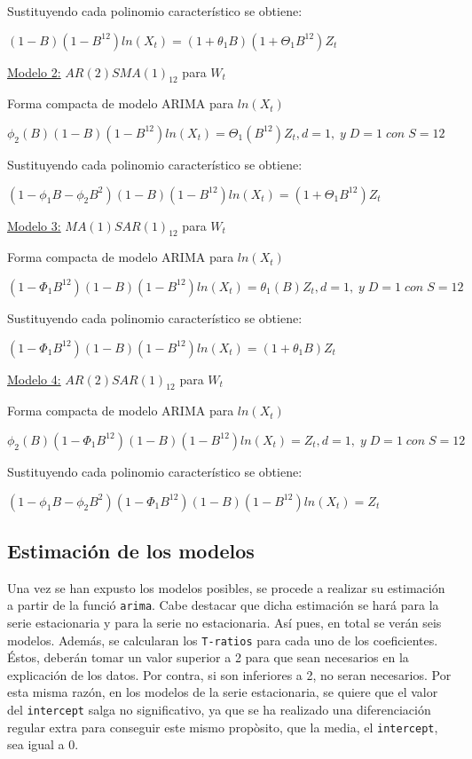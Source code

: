 \documentclass[
]{article}
\begin{document}
Sustituyendo cada polinomio característico se obtiene:

\((1-B)(1-B^{12}) ln(X_t) = (1+\theta_1B)(1+\Theta_1B^{12})Z_t\)

\medskip

\underline{Modelo 2:} \(AR(2)SMA(1)_{12}\) para \(W_t\)

Forma compacta de modelo ARIMA para \(ln(X_t)\)

\(\phi_2(B) (1-B)(1-B^{12}) ln(X_t) = \Theta_1(B^{12})Z_t, d = 1,\; y \; D = 1 \; con \; S = 12\)

Sustituyendo cada polinomio característico se obtiene:

\((1-\phi_1B-\phi_2B^2)(1-B)(1-B^{12}) ln(X_t) = (1+\Theta_1B^{12})Z_t\)

\medskip

\underline{Modelo 3:} \(MA(1)SAR(1)_{12}\) para \(W_t\)

Forma compacta de modelo ARIMA para \(ln(X_t)\)

\((1-\Phi_1B^{12})(1-B)(1-B^{12}) ln(X_t) =\theta_1(B)Z_t, d = 1,\; y \; D = 1 \; con \; S = 12\)

Sustituyendo cada polinomio característico se obtiene:

\((1-\Phi_1B^{12})(1-B)(1-B^{12}) ln(X_t) = (1+\theta_1B)Z_t\)

\medskip

\underline{Modelo 4:} \(AR(2)SAR(1)_{12}\) para \(W_t\)

Forma compacta de modelo ARIMA para \(ln(X_t)\)

\(\phi_2(B)(1-\Phi_1B^{12})(1-B)(1-B^{12}) ln(X_t) = Z_t, d = 1,\; y \; D = 1 \; con \; S = 12\)

Sustituyendo cada polinomio característico se obtiene:

\((1-\phi_1B-\phi_2B^2)(1-\Phi_1B^{12})(1-B)(1-B^{12}) ln(X_t) = Z_t\)

\hypertarget{estimaciuxf3n-de-los-modelos}{%
\subsection{Estimación de los
modelos}\label{estimaciuxf3n-de-los-modelos}}

Una vez se han expusto los modelos posibles, se procede a realizar su
estimación a partir de la funció \texttt{arima}. Cabe destacar que dicha
estimación se hará para la serie estacionaria y para la serie no
estacionaria. Así pues, en total se verán seis modelos. Además, se
calcularan los \texttt{T-ratios} para cada uno de los coeficientes.
Éstos, deberán tomar un valor superior a 2 para que sean necesarios en
la explicación de los datos. Por contra, si son inferiores a 2, no seran
necesarios. Por esta misma razón, en los modelos de la serie
estacionaria, se quiere que el valor del \texttt{intercept} salga no
significativo, ya que se ha realizado una diferenciación regular extra
para conseguir este mismo propòsito, que la media, el
\texttt{intercept}, sea igual a 0.
\end{document}
